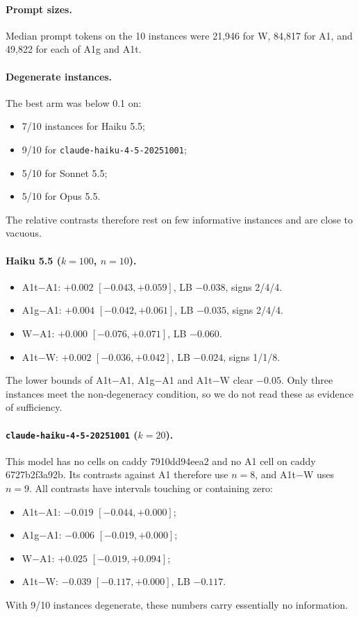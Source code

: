 \paragraph{Prompt sizes.} Median prompt tokens on the 10 instances were 21,946 for W, 84,817 for A1, and 49,822 for each of A1g and A1t.

\paragraph{Degenerate instances.} The best arm was below 0.1 on:
\begin{itemize}
\item 7/10 instances for Haiku 5.5;
\item 9/10 for \texttt{claude-haiku-4-5-20251001};
\item 5/10 for Sonnet 5.5;
\item 5/10 for Opus 5.5.
\end{itemize}
The relative contrasts therefore rest on few informative instances and are close to vacuous.

\paragraph{Haiku 5.5 ($k=100$, $n=10$).}
\begin{itemize}
\item A1t$-$A1: $+0.002$ $[-0.043, +0.059]$, LB $-0.038$, signs 2/4/4.
\item A1g$-$A1: $+0.004$ $[-0.042, +0.061]$, LB $-0.035$, signs 2/4/4.
\item W$-$A1: $+0.000$ $[-0.076, +0.071]$, LB $-0.060$.
\item A1t$-$W: $+0.002$ $[-0.036, +0.042]$, LB $-0.024$, signs 1/1/8.
\end{itemize}
The lower bounds of A1t$-$A1, A1g$-$A1 and A1t$-$W clear $-0.05$. Only three instances meet the non-degeneracy condition, so we do not read these as evidence of sufficiency.

\paragraph{\texttt{claude-haiku-4-5-20251001} ($k=20$).} This model has no cells on caddy 7910dd94eea2 and no A1 cell on caddy 6727b2f3a92b. Its contrasts against A1 therefore use $n=8$, and A1t$-$W uses $n=9$. All contrasts have intervals touching or containing zero:
\begin{itemize}
\item A1t$-$A1: $-0.019$ $[-0.044, +0.000]$;
\item A1g$-$A1: $-0.006$ $[-0.019, +0.000]$;
\item W$-$A1: $+0.025$ $[-0.019, +0.094]$;
\item A1t$-$W: $-0.039$ $[-0.117, +0.000]$, LB $-0.117$.
\end{itemize}
With 9/10 instances degenerate, these numbers carry essentially no information.

